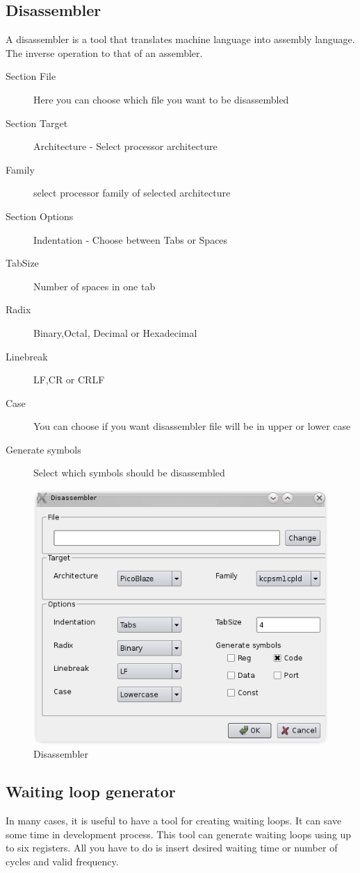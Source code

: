\subsection{Disassembler}
    A disassembler is a tool that translates machine language into assembly language. The inverse
    operation to that of an assembler.

    \begin{description}
        \item[Section File] Here you can choose which file you want to be disassembled
        \item[Section Target] Architecture - Select processor architecture
        \item[Family] select processor family of selected architecture
        \item[Section Options] Indentation - Choose between Tabs or Spaces
        \item[TabSize] Number of spaces in one tab
        \item[Radix] Binary,Octal, Decimal or Hexadecimal
        \item[Linebreak] LF,CR or CRLF
        \item[Case]  You can choose if you want disassembler file will be in upper or lower case
        \item[Generate symbols] Select which symbols should be disassembled
    \end{description}

    \begin{figure}[h]
        \centering{}
        \includegraphics[width=.5\textwidth]{img/disassembler_window.png}
        \caption{Disassembler}
    \end{figure}

\subsection{Waiting loop generator}
    In many cases, it is useful to have a tool for creating waiting loops. It can save some time in development process. This tool can generate
    waiting loops using up to six registers. All you have to do is insert desired waiting time or number of cycles and valid frequency.

